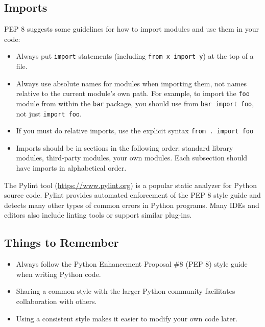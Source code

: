 \documentclass{article}
\begin{document}
\subsection{Imports}
PEP 8 suggests some guidelines for how to import modules and use
them in your code:
\begin{itemize}
	\item Always put  \texttt{import} statements (including  \texttt{from x import y}) at the
top of a file.
	\item Always use absolute names for modules when importing them, not
names relative to the current module’s own path. For example, to
import the  \texttt{foo} module from within the  \texttt{bar} package, you should
use from  \texttt{bar import foo}, not just  \texttt{import foo}.
	\item If you must do relative imports, use the explicit syntax \texttt{from . import foo}
	\item Imports should be in sections in the following order: standard
library modules, third-party modules, your own modules. Each
subsection should have imports in alphabetical order.
	\end{itemize}

\begin{warn}[Note:]
The Pylint tool (\url{https://www.pylint.org}) is a popular static analyzer for Python
source code. Pylint provides automated enforcement of the PEP 8 style guide and
detects many other types of common errors in Python programs. Many IDEs and
editors also include linting tools or support similar plug-ins.
\end{warn}

\subsection{Things to Remember}

\begin{itemize}
	\item Always follow the Python Enhancement Proposal \#8 (PEP 8) style
guide when writing Python code.
	\item Sharing a common style with the larger Python community facilitates
collaboration with others.
	\item Using a consistent style makes it easier to modify your own code later.
\end{itemize}


\end{document}
